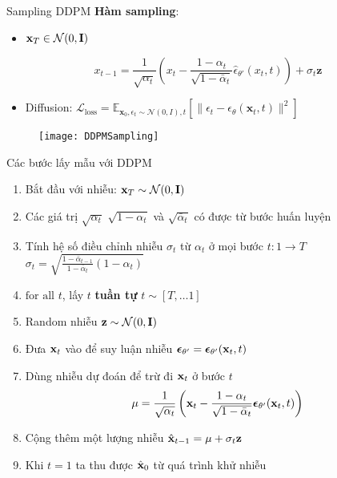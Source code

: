 \begin{frame}{Sampling DDPM}
	\textbf{Hàm sampling}:
	\begin{itemize}
		\item $\mathbf{x}_T \in \mathcal{N}(0, \mathbf{I})$
	\end{itemize}
	
	\begin{equation*}
		x_{t-1} = \frac{1}{\sqrt{\alpha_t}} \left( x_t - \frac{1 - \alpha_t}{\sqrt{1 - \bar{\alpha}_t}} \hat{\epsilon}_{\theta'}(x_t, t) \right) + \sigma_t \mathbf{z}
	\end{equation*}
	
	\begin{itemize}
		\item Diffusion: $\mathcal{L}_{\text{loss}}= \mathbb{E}_{\mathbf{x}_{0}, \epsilon_t \sim \mathcal{N}(0, I), t} \left[ \| \epsilon_t - \epsilon_\theta(\mathbf{x}_t, t) \|^2 \right]$
	\end{itemize}
	\begin{figure}
		\centering
		\texttt{[image: DDPMSampling]}
	\end{figure}
\end{frame}

\begin{frame}{Các bước lấy mẫu với DDPM}
	
	\begin{enumerate}
		\item Bắt đầu với nhiễu: $\mathbf{x}_T \sim \mathcal{N}(0, \mathbf{I})$
		\item Các giá trị $\sqrt{\alpha_t}$ $\sqrt{1 - \alpha_t}$ và $\sqrt{\bar{\alpha}_t}$ có được từ bước huấn luyện
		\item Tính hệ số điều chỉnh nhiễu $\sigma_t$ từ $\alpha_t$ ở mọi bước $t: 1 \rightarrow T$
		$\sigma_t = \sqrt{\frac{1 - \bar{\alpha}_{t-1}}{1 - \bar{\alpha}_t} (1 - \alpha_t)}$
		
		\item $\text{for all}$ $t$, lấy $t$ \textbf{tuần tự} $t \sim [T, \dots 1]$
		\item Random nhiễu $\mathbf{z} \sim \mathcal{N}(0, \mathbf{I})$
		\item Đưa $\mathbf{x}_t$ vào để suy luận nhiễu ${\boldsymbol{\epsilon}}_{\theta'} = {\boldsymbol{\epsilon}}_{\theta'}(\mathbf{x}_t, t)$
		\item Dùng nhiễu dự đoán để trừ đi $\mathbf{x}_t$ ở bước $t$
			$$\mu =  \frac{1}{\sqrt{\alpha_t}}\left( \mathbf{x}_t - \frac{1-\alpha_t}{\sqrt{1-\bar\alpha_t}} {\boldsymbol{\epsilon}}_{\theta'}(\mathbf{x}_t, t) \right)$$
		\item Cộng thêm một lượng nhiễu $\hat{\mathbf{x}}_{t-1} = \mu + \sigma_t \mathbf{z}$
		\item Khi $t=1$ ta thu được $\hat{\mathbf{x}}_0$ từ quá trình khử nhiễu
	\end{enumerate}
\end{frame}

